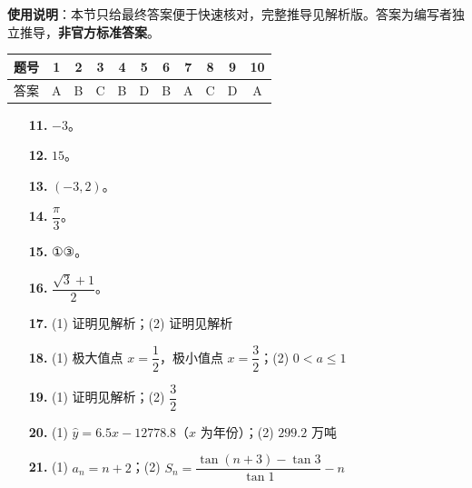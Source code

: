 
\begin{gknotice}
\textbf{使用说明}：本节只给最终答案便于快速核对，完整推导见解析版。答案为编写者独立推导，\textbf{非官方标准答案}。
\end{gknotice}

\begin{center}\begin{tabular}{ccccccccccc}
\toprule
题号 & 1 & 2 & 3 & 4 & 5 & 6 & 7 & 8 & 9 & 10 \\
\midrule
答案 & A & B & C & B & D & B & A & C & D & A \\
\bottomrule
\end{tabular}\end{center}

\begin{itemize}[leftmargin=2.6em]
  \item[\textbf{11.}] $-3$。
  \item[\textbf{12.}] $15$。
  \item[\textbf{13.}] $(-3,2)$。
  \item[\textbf{14.}] $\dfrac{\pi}{3}$。
  \item[\textbf{15.}] ①③。
\end{itemize}

\begin{itemize}[leftmargin=2.6em]
  \item[\textbf{16.}] $\dfrac{\sqrt3+1}{2}$。
  \item[\textbf{17.}] (1) 证明见解析；(2) 证明见解析
  \item[\textbf{18.}] (1) 极大值点 $x=\dfrac12$，极小值点 $x=\dfrac32$；(2) $0<a\leqslant1$
  \item[\textbf{19.}] (1) 证明见解析；(2) $\dfrac32$
  \item[\textbf{20.}] (1) $\hat y=6.5x-12778.8$（$x$ 为年份）；(2) $299.2$ 万吨
  \item[\textbf{21.}] (1) $a_n=n+2$；(2) $S_n=\dfrac{\tan(n+3)-\tan3}{\tan1}-n$
\end{itemize}

